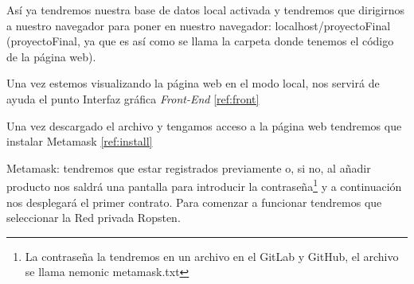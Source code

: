 Así ya tendremos nuestra base de datos local activada y tendremos que dirigirnos a nuestro navegador para poner en nuestro navegador: localhost/proyectoFinal (proyectoFinal, ya que es así como se llama la carpeta donde tenemos el código de la página web).

Una vez estemos visualizando la página web en el modo local, nos servirá de ayuda el punto Interfaz gráfica \textit{Front-End} \ref{ref:front}

Una vez descargado el archivo y tengamos acceso a la página web tendremos que instalar Metamask \ref{ref:install}

Metamask: tendremos que estar registrados previamente o, si no, al añadir producto nos saldrá una pantalla para introducir la contraseña\footnote{La contraseña la tendremos en un archivo en el GitLab y GitHub, el archivo se llama nemonic metamask.txt} y a continuación nos desplegará el primer contrato. Para comenzar a funcionar tendremos que  seleccionar la Red privada Ropsten.

